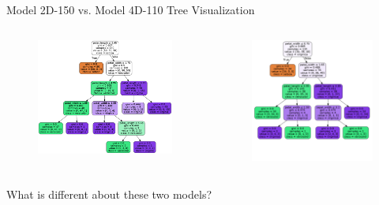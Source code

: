 \documentclass[aspectratio=169]{../latex_main/tntbeamer}  %
\begin{document}
	
	\begin{frame}{Model 2D-150 vs. Model 4D-110 Tree Visualization}
	    \begin{columns}
	        \begin{column}{.5\textwidth}
	                \begin{figure}
	                    \includegraphics[scale=.53]{Bild23}
	                \end{figure}
	        \end{column}
	   
	        \begin{column}{.5\textwidth}
	                \begin{figure}
	                    \includegraphics[scale=.33]{Bild35}
	                \end{figure}
	        \end{column}
	    \end{columns}
	    What is different about these two models?
	\end{frame}
	
\end{document}
